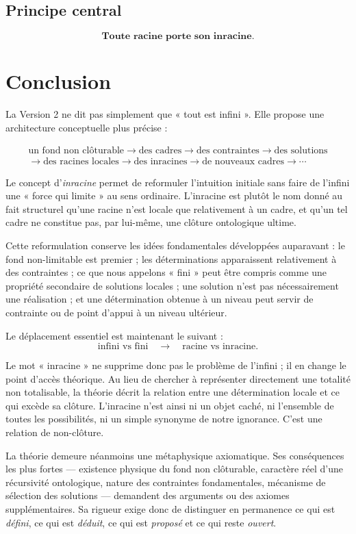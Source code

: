 \documentclass[11pt,a4paper]{article}
\begin{document}
\subsection*{Principe central}
\[
\boxed{
\textbf{Toute racine porte son inracine.}
}
\]

\section{Conclusion}

La Version 2 ne dit pas simplement que « tout est infini ». Elle propose une
architecture conceptuelle plus précise :

\[
\boxed{\begin{gathered}
\text{un fond non clôturable}
\to
\text{des cadres}
\to
\text{des contraintes}
\to
\text{des solutions}\\
\to
\text{des racines locales}
\to
\text{des inracines}
\to
\text{de nouveaux cadres}
\to\cdots
\end{gathered}}
\]

Le concept d'\emph{inracine} permet de reformuler l'intuition initiale sans
faire de l'infini une « force qui limite » au sens ordinaire. L'inracine est
plutôt le nom donné au fait structurel qu'une racine n'est locale que
relativement à un cadre, et qu'un tel cadre ne constitue pas, par lui-même,
une clôture ontologique ultime.

Cette reformulation conserve les idées fondamentales développées auparavant :
le fond non-limitable est premier ; les déterminations apparaissent relativement
à des contraintes ; ce que nous appelons « fini » peut être compris comme une
propriété secondaire de solutions locales ; une solution n'est pas
nécessairement une réalisation ; et une détermination obtenue à un niveau peut
servir de contrainte ou de point d'appui à un niveau ultérieur.

Le déplacement essentiel est maintenant le suivant :
\[
\boxed{
\text{infini vs fini}
\quad\longrightarrow\quad
\text{racine vs inracine}.
}
\]

Le mot « inracine » ne supprime donc pas le problème de l'infini ; il en change
le point d'accès théorique. Au lieu de chercher à représenter directement une
totalité non totalisable, la théorie décrit la relation entre une détermination
locale et ce qui excède sa clôture. L'inracine n'est ainsi ni un objet caché,
ni l'ensemble de toutes les possibilités, ni un simple synonyme de notre
ignorance. C'est une relation de non-clôture.

La théorie demeure néanmoins une métaphysique axiomatique. Ses conséquences
les plus fortes --- existence physique du fond non clôturable, caractère réel
d'une récursivité ontologique, nature des contraintes fondamentales,
mécanisme de sélection des solutions --- demandent des arguments ou des
axiomes supplémentaires. Sa rigueur exige donc de distinguer en permanence ce
qui est \emph{défini}, ce qui est \emph{déduit}, ce qui est \emph{proposé} et ce
qui reste \emph{ouvert}.
\end{document}

